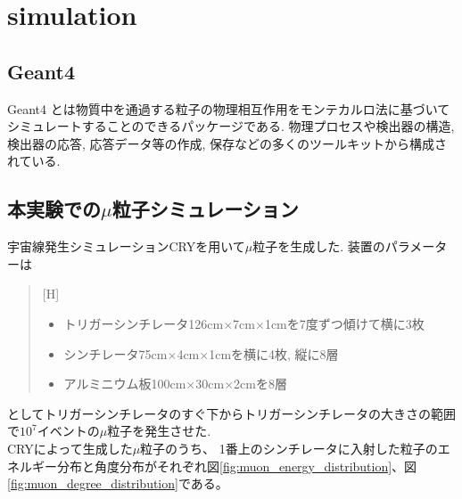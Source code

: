 \chapter{simulation}\label{simulation}
\section{Geant4}
Geant4 とは物質中を通過する粒子の物理相互作用をモンテカルロ法に基づいてシミュレートすることのできるパッケージである.
物理プロセスや検出器の構造, 検出器の応答, 応答データ等の作成, 保存などの多くのツールキットから構成されている.

\section{本実験での$\mu$粒子シミュレーション}
宇宙線発生シミュレーションCRYを用いて$\mu$粒子を生成した.
装置のパラメーターは
\begin{quote}[H]
    \begin{itemize}
        \item トリガーシンチレータ126cm$\times$7cm$\times$1cmを7度ずつ傾けて横に3枚
        \item シンチレータ75cm$\times$4cm$\times$1cmを横に4枚, 縦に8層
        \item アルミニウム板100cm$\times$30cm$\times$2cmを8層
    \end{itemize}
\end{quote}
としてトリガーシンチレータのすぐ下からトリガーシンチレータの大きさの範囲で$10^{7}$イベントの$\mu$粒子を発生させた.
\\
CRYによって生成した$\mu$粒子のうち、
1番上のシンチレータに入射した粒子のエネルギー分布と角度分布がそれぞれ図\ref{fig:muon_energy_distribution}、図\ref{fig:muon_degree_distribution}である。
